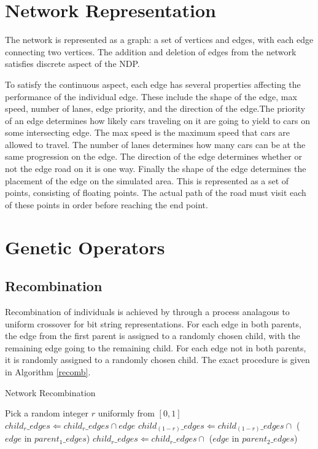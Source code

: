 \documentclass[11pt, oneside, notitlepage, draft]{article}
\begin{document}
    \section{Network Representation}
        The network is represented as a graph: a set of vertices and edges, with each edge connecting two vertices. The addition and deletion of edges from the network satisfies discrete aspect of the NDP.

        To satisfy the continuous aspect, each edge has several properties affecting the performance of the individual edge. These include the shape of the edge, max speed, number of lanes, edge priority, and the direction of the edge.The priority of an edge determines how likely cars traveling on it are going to yield to cars on some intersecting edge. The max speed is the maximum speed that cars are allowed to travel. The number of lanes determines how many cars can be at the same progression on the edge. The direction of the edge determines whether or not the edge road on it is one way. Finally the shape of the edge determines the placement of the edge on the simulated area. This is represented as a set of points, consisting of floating points. The actual path of the road must visit each of these points in order before reaching the end point.





    \section{Genetic Operators}
        \subsection{Recombination}
            Recombination of individuals is achieved by through a process analagous to uniform crossover for bit string representations. For each edge in both parents, the edge from the first parent is assigned to a randomly chosen child, with the remaining edge going to the remaining child. For each edge not in both parents, it is randomly assigned to a randomly chosen child. The exact procedure is given in Algorithm \ref{recomb}.

            \begin{algorithm}
            \caption{Network Recombination}
            \label{recomb}
            \begin{algorithmic}
            \STATE Pick a random integer $r$ uniformly from $[0,1]$
            \STATE $child_r\_edges \Leftarrow child_r\_edges \cap edge$ 
            \ELSE
            \STATE $child_{(1-r)}\_edges \Leftarrow child_{(1-r)}\_edges \cap$ ($edge$ in $parent_1\_edges$)
            \STATE $child_r\_edges \Leftarrow child_r\_edges \cap$ ($edge$ in $parent_2\_edges$)
            \ENDIF
            \ENDFOR
            \end{algorithmic}
            \end{algorithm}
\end{document}

